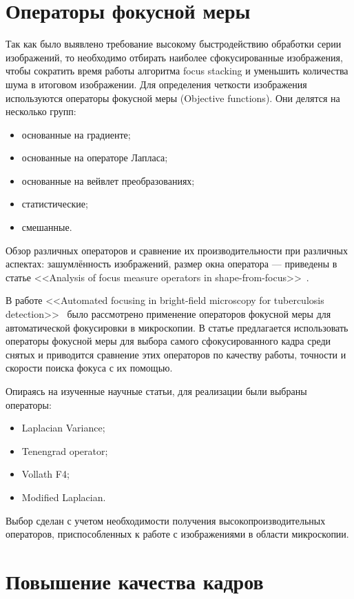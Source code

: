 \documentclass[14pt]{matmex-diploma-custom}
\begin{document}
\section{Операторы фокусной меры}
Так как было выявлено требование высокому быстродействию обработки серии изображений, то необходимо отбирать наиболее сфокусированные изображения, чтобы сократить время работы алгоритма focus stacking и уменьшить количества шума в итоговом изображении. Для определения четкости изображения используются операторы фокусной меры (Objective functions). Они делятся на несколько групп:
\begin{itemize}
    \item основанные на градиенте;
    \item основанные на операторе Лапласа;
    \item основанные на вейвлет преобразованиях;
    \item статистические;
    \item смешанные.
\end{itemize}

Обзор различных операторов и сравнение их производительности при различных аспектах: зашумлённость изображений, размер окна оператора --- приведены в статье <<Analysis of focus measure operators in shape-from-focus>>~\cite{MeasureOperators}.

В работе <<Automated focusing in bright-field microscopy for tuberculosis detection>>~\cite{BestOperators} было рассмотрено применение операторов фокусной меры для автоматической фокусировки в микроскопии. В статье предлагается использовать операторы фокусной меры для выбора самого сфокусированного кадра среди снятых и приводится сравнение этих операторов по качеству работы, точности и скорости поиска фокуса с их помощью.

Опираясь на изученные научные статьи, для реализации были выбраны операторы:
\begin{itemize}
    \item Laplacian Variance; 
    \item Tenengrad operator;
    \item Vollath F4;
    \item Modified Laplacian.
\end{itemize}
Выбор сделан с учетом необходимости получения высокопроизводительных операторов, приспособленных к работе с изображениями в области микроскопии.

\section{Повышение качества кадров}
\end{document}
